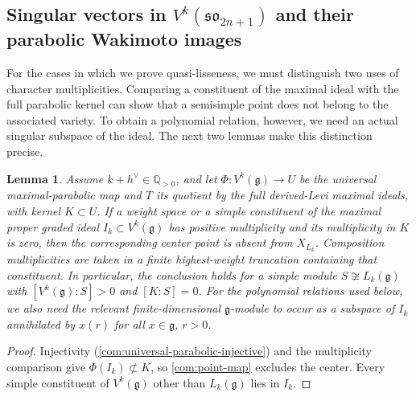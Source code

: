 \documentclass[11pt,a4paper]{amsart}
\numberwithin{equation}{section}
\newtheorem{lemma}[theorem]{Lemma}
\theoremstyle{definition}
\theoremstyle{remark}
\newcommand{\Q}{\mathbb Q}
\newcommand{\g}{\mathfrak g}
\newcommand{\sog}{\mathfrak{so}}
\begin{document}
\subsection{\texorpdfstring{Singular vectors in $V^k(\sog_{2n+1})$ and their parabolic Wakimoto images}{Singular vectors in V(k)(so(2n+1)) and their parabolic Wakimoto images}}\label{B:relations}
For the cases in which we prove quasi-lisseness, we must distinguish
two uses of character
multiplicities. Comparing a constituent of the maximal ideal with
the full parabolic kernel can show that a semisimple point does not
belong to the associated variety. To
obtain a polynomial relation, however, we need an actual singular
subspace of the ideal. The next two lemmas make this distinction precise.

\begin{lemma}\label{com:whole-kernel}\label{seed:B-constituent}
Assume $k+h^\vee\in\Q_{>0}$, and let
$\Phi:V^k(\g)\to U$ be the universal maximal-parabolic map and
$T$ its quotient by the full derived-Levi maximal ideals, with kernel
$K\subset U$. If a weight space or a simple constituent of the maximal
proper graded ideal $I_k\subset V^k(\g)$ has positive multiplicity and its multiplicity in
$K$ is zero, then the corresponding center point is absent from $X_{L_k}$.
Composition multiplicities are taken in a finite highest-weight
truncation containing that constituent. In particular, the conclusion
holds for a simple module $S\not\cong L_k(\g)$ with $[V^k(\g):S]>0$ and $[K:S]=0$.
For the polynomial relations used below, we also need the relevant
finite-dimensional $\g$-module to occur as a subspace of $I_k$
annihilated by $x(r)$ for all $x\in\g$, $r>0$.
\end{lemma}
\begin{proof}
Injectivity (\cref{com:universal-parabolic-injective}) and the multiplicity
comparison give $\Phi(I_k)\not\subset K$, so \cref{com:point-map}
excludes the center. Every simple constituent of $V^k(\g)$ other than $L_k(\g)$ lies in $I_k$.
\end{proof}
\end{document}
